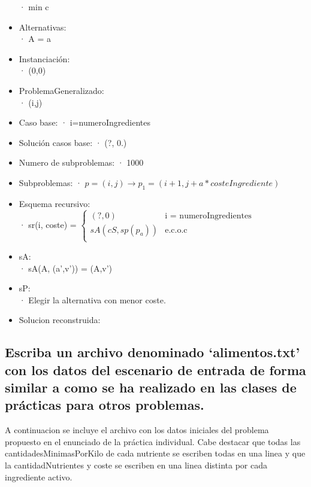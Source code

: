 \documentclass[a4paper,12pt]{article}
\begin{document}
\begin{itemize}
        · min c
  \item Alternativas:\\
        · A = {a \in [1,1000]}
  \item Instanciación:\\
        · (0,0)
  \item ProblemaGeneralizado:\\
        · (i,j)
  \item Caso base:
        · i=numeroIngredientes
  \item Solución casos base:
        · (?, 0.)
  \item Numero de subproblemas:
        · 1000
  \item Subproblemas:
        · $p = (i,j) \rightarrow p_1 = (i+1, j+a*costeIngrediente)$
  \item Esquema recursivo:\\
        · sr(i, coste) = $\begin{cases}
        (?,0)  &\mbox{i = numeroIngredientes}\\
        sA(cS, sp(p_a)) &\mbox{e.c.o.c}\\

        \end{cases}$

  \item sA:\\
        · sA(A, (a',v')) = (A,v')
  \item sP:\\
        · Elegir la alternativa con menor coste.
  \item Solucion reconstruida:


\end{itemize}




\subsection{Escriba un archivo denominado `alimentos.txt' con los datos del escenario de entrada de forma similar a como se ha realizado en las clases de prácticas para otros problemas.}
A continuacion se incluye el archivo con los datos iniciales del problema propuesto en el enunciado de la práctica individual.
Cabe destacar que todas las cantidadesMinimasPorKilo de cada nutriente se escriben todas en una linea
y que la cantidadNutrientes y coste se escriben en una linea distinta por cada ingrediente activo.
\inputminted[fontsize=\footnotesize,breaklines]{text}{ficheros/alimentos.txt}
\end{document}
